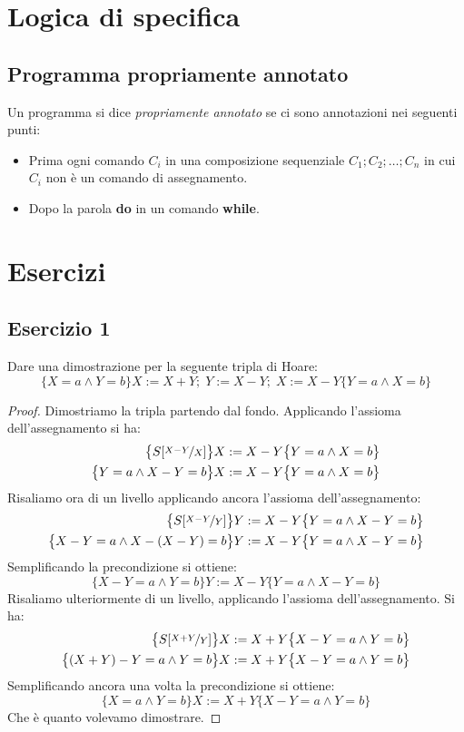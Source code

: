 \section{Logica di specifica}


\subsection{Programma propriamente annotato}
\begin{definizione}
Un programma si dice \emph{propriamente annotato} se ci sono annotazioni nei seguenti punti:
\begin{itemize}
        \item Prima ogni comando $C_i$ in una composizione sequenziale $C_1;C_2; \dots ;C_n$ in cui $C_i$ non è un comando di assegnamento.
        \item Dopo la parola \textbf{do} in un comando \textbf{while}.
\end{itemize}
\end{definizione}


\section{Esercizi}

\subsection{Esercizio 1}
Dare una dimostrazione per la seguente tripla di Hoare:
\[ \{X=a  \land Y=b\}  X:=X+Y; \; Y:=X-Y; \; X:=X-Y  \{Y=a  \land  X=b\} \]

\begin{proof}
Dimostriamo la tripla partendo dal fondo. Applicando l'assioma dell'assegnamento si ha:
\begin{align*}
  \bigl\{S[\nicefrac{X-Y}{X}] \bigr\} &  X:=X-Y  \bigl\{Y=a  \land  X=b\bigr\}\\
  \bigl\{Y=a  \land X-Y=b \bigr\} & X:=X-Y  \bigl\{Y=a  \land  X=b\bigr\}
\end{align*}
Risaliamo ora di un livello applicando ancora l'assioma dell'assegnamento:
\begin{align*}
  \bigl\{S[\nicefrac{X-Y}{Y}] \bigr\} & Y:=X-Y \bigl\{Y=a  \land  X-Y=b\bigr\}\\
  \bigl\{X-Y=a  \land X-(X-Y)=b \bigr\} & Y:=X-Y \bigl\{Y=a  \land  X-Y=b\bigr\}
\end{align*}
Semplificando la precondizione si ottiene:
\[ \bigl\{X-Y=a  \land Y=b \bigr\}  Y:=X-Y  \bigl\{Y=a  \land  X-Y=b\bigr\} \]
Risaliamo ulteriormente di un livello, applicando l'assioma dell'assegnamento. Si ha:
\begin{align*}
  \bigl\{S[\nicefrac{X+Y}{Y}] \bigr\} & X:=X+Y \bigl\{X-Y=a  \land  Y=b\bigr\}\\
  \bigl\{(X+Y)-Y=a  \land Y=b \bigr\} & X:=X+Y \bigl\{X-Y=a  \land  Y=b\bigr\}
\end{align*}
Semplificando ancora una volta la precondizione si ottiene:
\[ \bigl\{X=a  \land Y=b \bigr\}  X:=X+Y  \bigl\{X-Y=a  \land  Y=b\bigr\} \]
Che è quanto volevamo dimostrare.
\end{proof}

